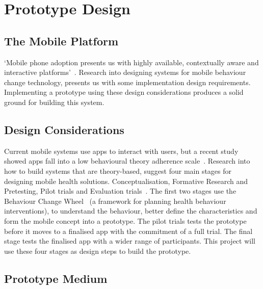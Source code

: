 
\newpage
\section{Prototype Design}

\subsection{The Mobile Platform}

`Mobile phone adoption presents us with highly available, contextually aware and interactive platforms'~\cite{article_mhealth}.
Research into designing systems for mobile behaviour change technology, presents us with some implementation design requirements.
Implementing a prototype using these design considerations produces a solid ground for building this system.

\subsection{Design Considerations}

Current mobile systems use apps to interact with users, but a recent study showed apps fall into a low behavioural theory adherence scale~\cite{article_mhealth}.
Research into how to build systems that are theory-based, suggest four main stages for designing mobile health solutions. Conceptualisation, Formative Research and Pretesting,
Pilot trials and Evaluation trials~\cite{article_mhealth}. The first two stages use the Behaviour Change Wheel~\cite{article_behaviour_change_wheel}
(a framework for planning health behaviour interventions), to understand the behaviour, better define the characteristics and form the mobile concept into a prototype.
The pilot trials tests the prototype before it moves to a finalised app with the commitment of a full trial. The final stage tests the finalised app with a wider range of participants.
This project will use these four stages as design steps to build the prototype.

\subsection{Prototype Medium}

